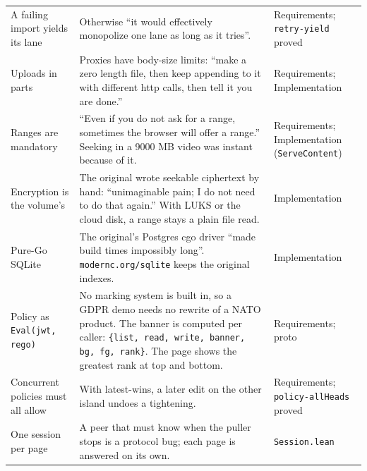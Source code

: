 \begin{longtable}{>{\raggedright}p{}>{\raggedright}p{}>{\raggedright\arraybackslash}p{}}
\addlinespace
A failing import yields its lane & Otherwise ``it would effectively monopolize one
lane as long as it tries''. & Requirements; \texttt{retry-yield} proved\\
\addlinespace
Uploads in parts & Proxies have body-size limits: ``make a zero length file, then
keep appending to it with different http calls, then tell it you are done.'' &
Requirements; Implementation\\
\addlinespace
Ranges are mandatory & ``Even if you do not ask for a range, sometimes the browser
will offer a range.'' Seeking in a 9000 MB video was instant because of it. &
Requirements; Implementation (\texttt{ServeContent})\\
\addlinespace
Encryption is the volume's & The original wrote seekable ciphertext by hand:
``unimaginable pain; I do not need to do that again.'' With LUKS or the cloud
disk, a range stays a plain file read. & Implementation\\
\addlinespace
Pure-Go SQLite & The original's Postgres cgo driver ``made build times impossibly
long''. \texttt{modernc.org/sqlite} keeps the original indexes. &
Implementation\\
\addlinespace
Policy as \texttt{Eval(jwt, rego)} & No marking system is built in, so a
GDPR demo needs no rewrite of a NATO product. The banner is computed per caller:
\texttt{\{list, read, write, banner, bg, fg, rank\}}. The page shows the greatest rank
at top and bottom. & Requirements; proto\\
\addlinespace
Concurrent policies must all allow & With latest-wins, a later edit on the other
island undoes a tightening. & Requirements; \texttt{policy-allHeads} proved\\
\addlinespace
One session per page & A peer that must know when the puller stops is a protocol
bug; each page is answered on its own. & \texttt{Session.lean}\\
\bottomrule
\end{longtable}
